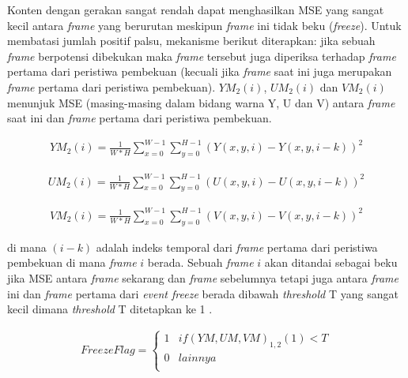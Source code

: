 Konten dengan gerakan sangat rendah dapat menghasilkan MSE yang sangat kecil antara \textit{frame} yang berurutan meskipun \textit{frame} ini tidak beku (\textit{freeze}). Untuk membatasi jumlah positif palsu, mekanisme berikut diterapkan: jika sebuah \textit{frame} berpotensi dibekukan maka \textit{frame} tersebut juga diperiksa terhadap \textit{frame} pertama dari peristiwa pembekuan (kecuali jika \textit{frame} saat ini juga merupakan \textit{frame} pertama dari peristiwa pembekuan). $YM_2(i)$, $UM_2(i)$ dan $VM_2(i)$ menunjuk MSE (masing-masing dalam bidang warna Y, U dan V) antara \textit{frame} saat ini dan \textit{frame} pertama dari peristiwa pembekuan\citep{Quan_Huynh_Thu_2009}.

\begin{equation}
	\begin{aligned}
		YM_{2}(i)=\frac{1}{W*H}\sum_{x=0}^{W-1}\sum_{y=0}^{H-1}(Y(x,y,i)-Y(x,y,i-k))^{2}
	\end{aligned}
\end{equation}

\begin{equation}
	\begin{aligned}
		UM_{2}(i)=\frac{1}{W*H}\sum_{x=0}^{W-1}\sum_{y=0}^{H-1}(U(x,y,i)-U(x,y,i-k))^{2}
	\end{aligned}
\end{equation}

\begin{equation}
	\begin{aligned}
		VM_{2}(i)=\frac{1}{W*H}\sum_{x=0}^{W-1}\sum_{y=0}^{H-1}(V(x,y,i)-V(x,y,i-k))^{2}
	\end{aligned}
\end{equation}

di mana $(i-k)$ adalah indeks temporal dari \textit{frame} pertama dari peristiwa pembekuan di mana \textit{frame} $i$ berada. Sebuah \textit{frame} $i$ akan ditandai sebagai beku jika MSE antara \textit{frame} sekarang dan \textit{frame} sebelumnya tetapi juga antara \textit{frame} ini dan \textit{frame} pertama dari \textit{event freeze} berada dibawah \textit{threshold} T yang sangat kecil dimana \textit{threshold} T ditetapkan ke 1  \citep{Quan_Huynh_Thu_2009}.

\begin{equation}
	\begin{aligned}
		FreezeFlag=\left\{\begin{matrix}
			1 & if(YM,UM,VM)_{1,2}(1)<T  \\
			0 & lainnya \\
		\end{matrix}\right.
	\end{aligned}
\end{equation}

